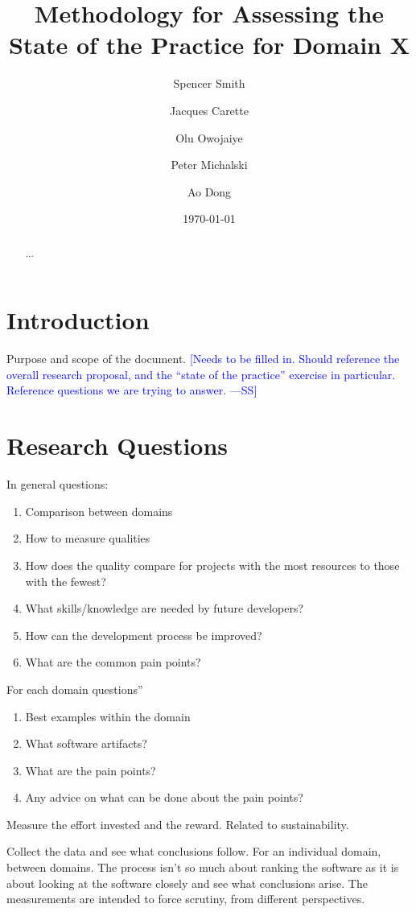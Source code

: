 \documentclass[letterpaper,cleveref]{lipics-v2019}
\title{Methodology for Assessing the State of the Practice for Domain X}
\author{Spencer Smith}{McMaster University, Canada}{smiths@mcmaster.ca}{}{}
\author{Jacques Carette}{McMaster University, Canada}{carette@mcmaster.ca}{}{}
\author{Olu Owojaiye}{McMaster University, Canada}{owojaiyo@mcmaster.ca}{}{}
\author{Peter Michalski}{McMaster University, Canada}{michap@mcmaster.ca}{}{}
\author{Ao Dong}{McMaster University, Canada}{donga9@mcmaster.ca}{}{}
\date{\today}
\newcommand{\authornote}[3]{\textcolor{#1}{[#3 ---#2]}}
\newcommand{\authornote}[3]{}
\newcommand{\wss}[1]{\authornote{blue}{SS}{#1}} %
\theoremstyle{definition}
\begin{document}
\maketitle

\begin{abstract}
	...
\end{abstract}

\tableofcontents

\section{Introduction} \label{SecIntroduction}

Purpose and scope of the document.  \wss{Needs to be filled in.  Should
	reference the overall research proposal, and the ``state of the practice''
	exercise in particular.  Reference questions we are trying to answer.}

\section{Research Questions}

In general questions:

\begin{enumerate}
\item Comparison between domains
\item How to measure qualities
\item How does the quality compare for projects with the most resources to those
  with the fewest?
\item What skills/knowledge are needed by future developers?
\item How can the development process be improved?
\item What are the common pain points?
\end{enumerate}

For each domain questions''

\begin{enumerate}
\item Best examples within the domain
\item What software artifacts?
\item What are the pain points?
\item Any advice on what can be done about the pain points?
\end{enumerate}

Measure the effort invested and the reward.  Related to sustainability.

Collect the data and see what conclusions follow.  For an individual domain,
between domains.  The process isn't so much about ranking the software as it is
about looking at the software closely and see what conclusions arise.  The
measurements are intended to force scrutiny, from different perspectives.
\end{document}
